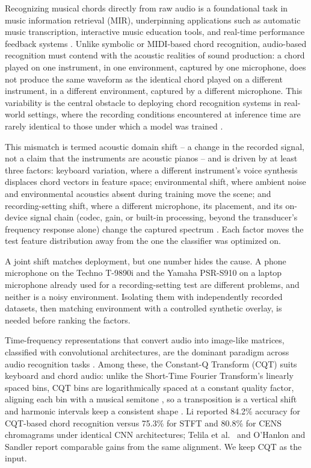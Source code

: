 \documentclass[pdflatex,sn-mathphys-num,iicol]{sn-jnl}
\begin{document}
Recognizing musical chords directly from raw audio is a foundational task in music information retrieval (MIR), underpinning applications such as automatic music transcription, interactive music education tools, and real-time performance feedback systems \cite{Telila2023,Saputra2021,Moysis2023}. Unlike symbolic or MIDI-based chord recognition, audio-based recognition must contend with the acoustic realities of sound production: a chord played on one instrument, in one environment, captured by one microphone, does not produce the same waveform as the identical chord played on a different instrument, in a different environment, captured by a different microphone. This variability is the central obstacle to deploying chord recognition systems in real-world settings, where the recording conditions encountered at inference time are rarely identical to those under which a model was trained \cite{Kusaka2024}.

This mismatch is termed acoustic domain shift -- a change in the recorded signal, not a claim that the instruments are acoustic pianos -- and is driven by at least three factors: keyboard variation, where a different instrument's voice synthesis displaces chord vectors in feature space; environmental shift, where ambient noise and environmental acoustics absent during training move the scene; and recording-setting shift, where a different microphone, its placement, and its on-device signal chain (codec, gain, or built-in processing, beyond the transducer's frequency response alone) change the captured spectrum \cite{Kusaka2024,Majchrzak2025}. Each factor moves the test feature distribution away from the one the classifier was optimized on.

A joint shift matches deployment, but one number hides the cause. A phone microphone on the Techno T-9890i and the Yamaha PSR-S910 on a laptop microphone already used for a recording-setting test are different problems, and neither is a noisy environment. Isolating them with independently recorded datasets, then matching environment with a controlled synthetic overlay, is needed before ranking the factors.

Time-frequency representations that convert audio into image-like matrices, classified with convolutional architectures, are the dominant paradigm across audio recognition tasks \cite{Wolf-Monheim2025,Zaman2023,Moysis2023}. Among these, the Constant-Q Transform (CQT) suits keyboard and chord audio: unlike the Short-Time Fourier Transform's linearly spaced bins, CQT bins are logarithmically spaced at a constant quality factor, aligning each bin with a musical semitone \cite{Lacoste2007}, so a transposition is a vertical shift and harmonic intervals keep a consistent shape \cite{Li2021}. Li \cite{Li2021} reported 84.2\% accuracy for CQT-based chord recognition versus 75.3\% for STFT and 80.8\% for CENS chromagrams under identical CNN architectures; Telila et al.\ \cite{Telila2023} and O'Hanlon and Sandler \cite{OHanlon2021} report comparable gains from the same alignment. We keep CQT as the input.
\end{document}
